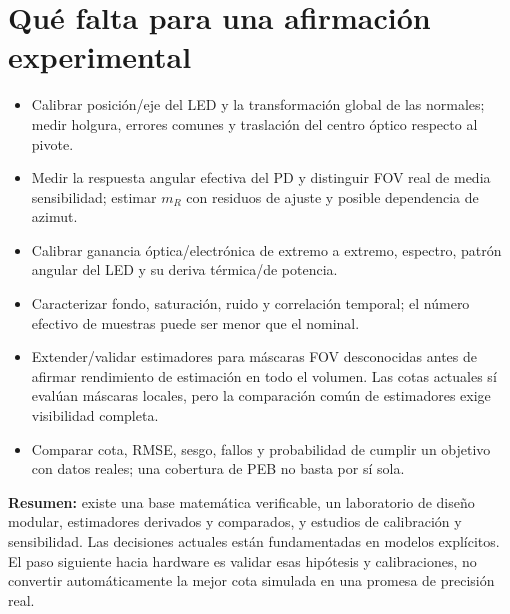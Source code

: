 \documentclass[11pt,a4paper]{article}
\begin{document}
\section{Qué falta para una afirmación experimental}
\begin{itemize}
\item Calibrar posición/eje del LED y la transformación global de las normales; medir holgura, errores comunes y traslación del centro óptico respecto al pivote.
\item Medir la respuesta angular efectiva del PD y distinguir FOV real de media sensibilidad; estimar $m_R$ con residuos de ajuste y posible dependencia de azimut.
\item Calibrar ganancia óptica/electrónica de extremo a extremo, espectro, patrón angular del LED y su deriva térmica/de potencia.
\item Caracterizar fondo, saturación, ruido y correlación temporal; el número efectivo de muestras puede ser menor que el nominal.
\item Extender/validar estimadores para máscaras FOV desconocidas antes de afirmar rendimiento de estimación en todo el volumen. Las cotas actuales sí evalúan máscaras locales, pero la comparación común de estimadores exige visibilidad completa.
\item Comparar cota, RMSE, sesgo, fallos y probabilidad de cumplir un objetivo con datos reales; una cobertura de PEB no basta por sí sola.
\end{itemize}
\textbf{Resumen:} existe una base matemática verificable, un laboratorio de diseño modular, estimadores derivados y comparados, y estudios de calibración y sensibilidad. Las decisiones actuales están fundamentadas en modelos explícitos. El paso siguiente hacia hardware es validar esas hipótesis y calibraciones, no convertir automáticamente la mejor cota simulada en una promesa de precisión real.
\end{document}
